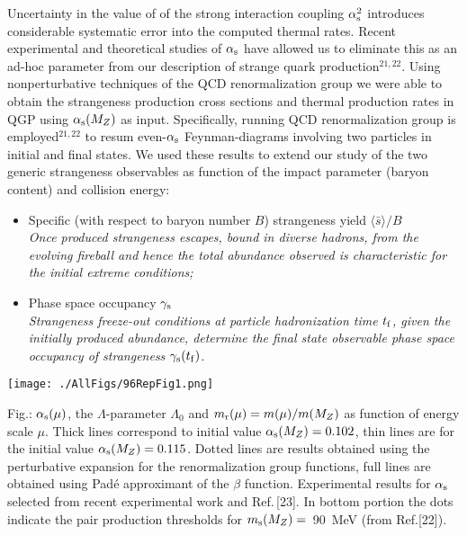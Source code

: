 \begin{mdframed}[linecolor=gray,roundcorner=12pt,backgroundcolor=Dandelion!15,linewidth=1pt,leftmargin=0cm,rightmargin=0cm,topline=true,bottomline=true,skipabove=12pt]
Uncertainty in the value of  of the strong interaction coupling $\alpha_{\rm s}^2$ introduces considerable systematic error into the computed thermal rates. Recent experimental and theoretical studies of $\alpha_{\rm s}$ have allowed us to eliminate this as an ad-hoc parameter from our description of strange quark production$^{21,22}$. Using nonperturbative techniques of the QCD renormalization group we were able to obtain the strangeness production cross sections and thermal production rates in QGP using $\alpha_{\rm s}(M_Z)$ as input. Specifically, running QCD renormalization group is employed$^{21,22}$ to resum even-$\alpha_{\rm s}$  Feynman-diagrams involving two particles in initial and final states.  We used these results to extend our study of the two generic strangeness observables as function of the impact parameter (baryon content) and collision energy:
\begin{itemize}
\item Specific (with respect to baryon number $B$) strangeness yield  $\langle \bar s\rangle/B$\\ {\it Once produced strangeness escapes, bound in diverse hadrons, from the evolving fireball and hence  the total abundance observed is characteristic for the initial extreme conditions;}
\item Phase space occupancy $\gamma_{\rm s}$\\ {\it Strangeness freeze-out conditions at particle hadronization time $t_{\rm f}$, given  the initially produced abundance, determine the final state observable phase space occupancy of strangeness $\gamma_{\rm s}(t_{\rm f})$.} 
\end{itemize}
\centerline{
\texttt{[image: ./AllFigs/96RepFig1.png]} 
} %
\noindent Fig.: $\alpha_{\rm s}(\mu)$, the $\Lambda$-parameter $\Lambda_0$ and $m_{\rm r}(\mu)=m(\mu)/m(M_Z)$ as function of energy scale $\mu$. Thick lines correspond to initial value $\alpha_{\rm s}(M_Z)=0.102$, thin lines are for the initial value $\alpha_{\rm s}(M_Z)=0.115$. Dotted lines are results obtained using the perturbative expansion for the renormalization group functions, full lines are obtained using  Pad\'e approximant of the $\beta$ function. Experimental results for $\alpha_{\rm s}$ selected from recent experimental work and Ref.\,[23]. In bottom portion the dots indicate the pair production thresholds for $m_{\rm s}(M_Z)=$~90~MeV (from Ref.[22]).\\


\end{mdframed}
